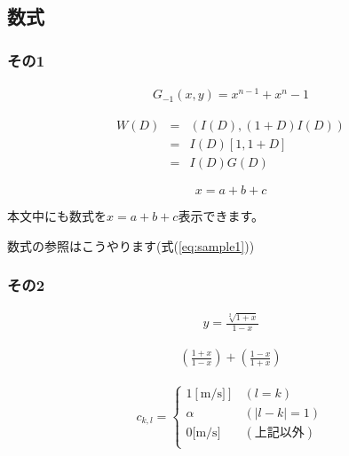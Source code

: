 \documentclass[12pt, b5paper]{ltjsarticle}
\begin{document}
        \subsection{数式}
            \subsubsection{その1}
                \begin{eqnarray}
                    G_{-1}(x,y)=x^{n-1}+x^n-1
                    \label{eq:sample1}
                \end{eqnarray}
                    
                \begin{eqnarray}
                    W(D)&=&(I(D),(1+D)I(D)) \nonumber \\
                    &=&I(D)[1,1+D] \nonumber \\
                    &=&I(D)G(D)
                \end{eqnarray} 
                
                \[
                x=a+b+c
                \]
                
                本文中にも数式を$ x=a+b+c $表示できます。\par
                数式の参照はこうやります(式(\ref{eq:sample1}))            
            \subsubsection{その2}
                \begin{eqnarray}
                    y=\frac{\sqrt[2]{1+x}}{1-x}
                    \end{eqnarray} 
                    
                    \begin{eqnarray}
                    \left(\frac{1+x}{1-x}\right) +(\frac{1-x}{1+x})
                    \end{eqnarray} 
                    
                    \begin{eqnarray}
                    c_{k,l}=\left\{ \begin{array}{ll}
                    1[\mathrm{m/s]}] & (l=k) \\
                    \alpha & (|l-k|=1) \\
                    0[\mathrm{m/s]} & (上記以外) \\
                    \end{array} \right.
                \end{eqnarray}
\end{document}
